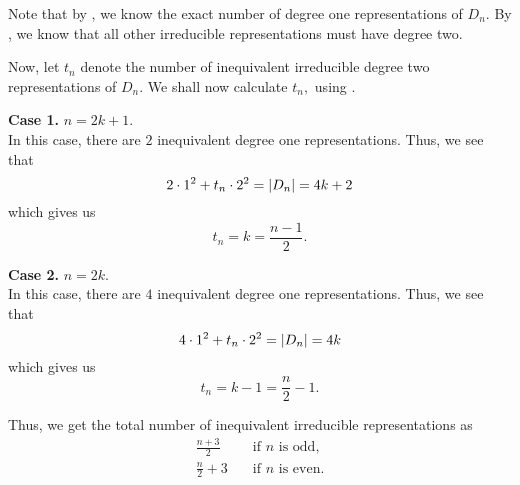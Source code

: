 \begin{ex} \label{ex:numirredrepsDn}
	Note that by , we know the exact number of degree one representations of $D_n.$ By , we know that all other irreducible representations must have degree two.

	Now, let $t_n$ denote the number of inequivalent irreducible degree two representations of $D_n.$ We shall now calculate $t_n,$ using .

	\textbf{Case 1.} $n = 2k + 1.$\\
	In this case, there are $2$ inequivalent degree one representations. Thus, we see that
	\begin{equation*} 
		2 \cdot 1^2 + t_n \cdot 2^2 = {\left\lvert D_n \right\lvert} = 4k + 2
	\end{equation*}
	which gives us
	\begin{equation*} 
		t_n = k = \frac{n - 1}{2}.
	\end{equation*}

	\textbf{Case 2.} $n = 2k.$\\
	In this case, there are $4$ inequivalent degree one representations. Thus, we see that
	\begin{equation*} 
		4 \cdot 1^2 + t_n \cdot 2^2 = {\left\lvert D_n \right\lvert} = 4k
	\end{equation*}
	which gives us
	\begin{equation*} 
		t_n = k - 1 = \frac{n}{2} - 1.
	\end{equation*}

	Thus, we get the total number of inequivalent irreducible representations as
	\begin{align*} 
		\frac{n + 3}{2} &\quad \text{if }n \text{ is odd,}\\
		\frac{n}{2} + 3 &\quad \text{if }n \text{ is even.}
	\end{align*}
\end{ex}


